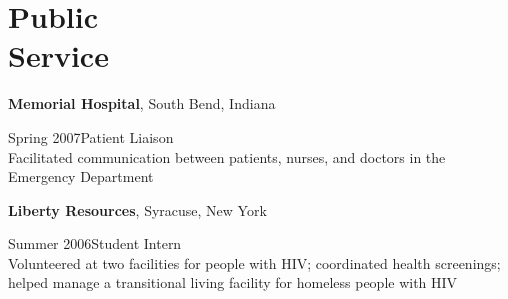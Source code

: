 \section{Public \\ Service}

{\bf Memorial Hospital}, South Bend, Indiana
\begin{list1}
\item[] Spring 2007\hspace{.2cm}Patient Liaison
\\Facilitated communication between patients, nurses, and doctors in the Emergency Department
\end{list1}


{\bf Liberty Resources}, Syracuse, New York
\begin{list1}
\item[] Summer 2006\hspace{.2cm}Student Intern
\\Volunteered at two facilities for people with HIV; coordinated health screenings; helped manage a transitional living facility for homeless people with HIV
\end{list1}

